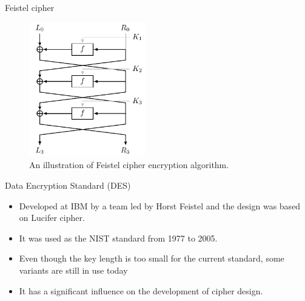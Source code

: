 \begin{frame}{Feistel cipher}
    \begin{figure}[htb]
    \centering
    \includegraphics[width=0.45\textwidth]{fig/Feistel_Cipher.pdf}
    \caption{An illustration of Feistel cipher encryption algorithm.}
\end{figure}
\end{frame}

\begin{frame}{Data Encryption Standard (DES)}
    \begin{itemize}
        \item Developed at IBM by a team led by Horst Feistel and the design was based on Lucifer cipher.
        \item It was used as the NIST standard from 1977 to 2005.
        \item Even though the key length is too small for the current standard, some variants are still in use today
        \item It has a significant influence on the development of cipher design.
    \end{itemize}
\end{frame}

